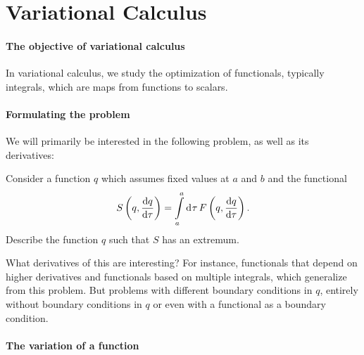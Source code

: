 \section{Variational Calculus}

\paragraph{The objective of variational calculus}
In variational calculus, we study the optimization of functionals, typically integrals, which are maps from functions to scalars.

\paragraph{Formulating the problem}
We will primarily be interested in the following problem, as well as its derivatives:

Consider a function $q$ which assumes fixed values at $a$ and $b$ and the functional
\begin{align*}
	S\left(q, \dv{q}{\tau}\right) = \integ{a}{b}{\tau}{F\left(q, \dv{q}{\tau}\right)}.
\end{align*}
Describe the function $q$ such that $S$ has an extremum.

What derivatives of this are interesting? For instance, functionals that depend on higher derivatives and functionals based on multiple integrals, which generalize from this problem. But problems with different boundary conditions in $q$, entirely without boundary conditions in $q$ or even with a functional as a boundary condition.

\paragraph{The variation of a function}